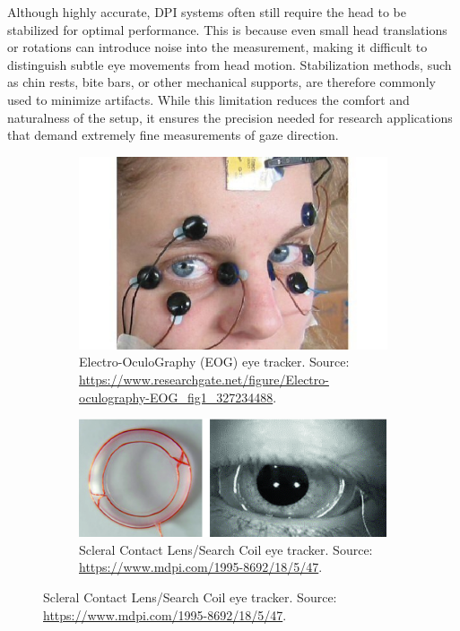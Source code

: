\documentclass[12pt]{report}
\begin{document}
Although highly accurate, DPI systems often still require the head to be stabilized for optimal performance. 
This is because even small head translations or rotations can introduce noise into the measurement, making it difficult to distinguish subtle eye movements from head motion. Stabilization methods, such as chin rests, bite bars, or other mechanical supports, are therefore commonly used to minimize artifacts.
While this limitation reduces the comfort and naturalness of the setup, it ensures the precision needed for research applications that demand extremely fine measurements of gaze direction.

\begin{figure}[ht]
    \centering
    \begin{subfigure}[b]{0.45\textwidth}
        \centering
        \includegraphics[width=1\textwidth,height=0.6\textwidth]{Images/Theory/eog.png}
        \caption{Electro-OculoGraphy (EOG) eye tracker. Source: \url{https://www.researchgate.net/figure/Electro-oculography-EOG_fig1_327234488}.}
        \label{fig:eog}
    \end{subfigure}
    \hfill
    \begin{subfigure}[b]{0.45\textwidth}
        \centering
        \includegraphics[width=1\textwidth,height=0.6\textwidth]{Images/Theory/coil.png}
        \caption{Scleral Contact Lens/Search Coil eye tracker. Source: \url{https://www.mdpi.com/1995-8692/18/5/47}.}
        \label{fig:coil}
    \end{subfigure}
    

\end{figure}
\end{document}
